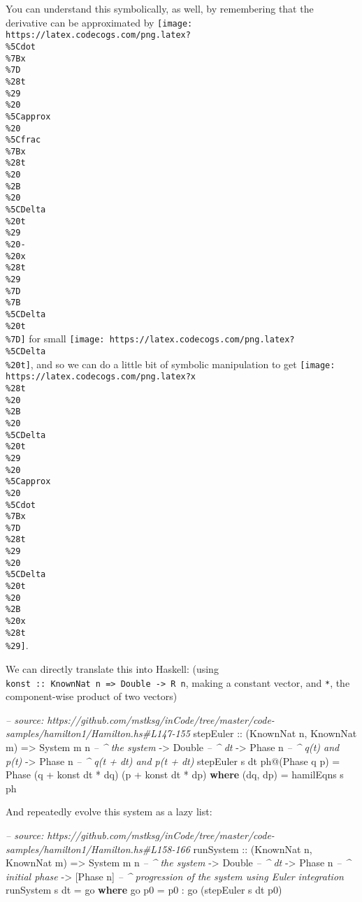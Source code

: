 \documentclass[]{article}
\newenvironment{Shaded}{}{}
\newcommand{\KeywordTok}[1]{\textcolor[rgb]{0.00,0.44,0.13}{\textbf{#1}}}
\newcommand{\DataTypeTok}[1]{\textcolor[rgb]{0.56,0.13,0.00}{#1}}
\newcommand{\CommentTok}[1]{\textcolor[rgb]{0.38,0.63,0.69}{\textit{#1}}}
\newcommand{\OtherTok}[1]{\textcolor[rgb]{0.00,0.44,0.13}{#1}}
\newcommand{\FunctionTok}[1]{\textcolor[rgb]{0.02,0.16,0.49}{#1}}
\newcommand{\NormalTok}[1]{#1}
\begin{document}
You can understand this symbolically, as well, by remembering that the
derivative can be approximated by
\texttt{[image: https://latex.codecogs.com/png.latex?\\\%5Cdot\\\%7Bx\\\%7D\\\%28t\\\%29\\\%20\\\%5Capprox\\\%20\\\%5Cfrac\\\%7Bx\\\%28t\\\%20\\\%2B\\\%20\\\%5CDelta\\\%20t\\\%29\\\%20-\\\%20x\\\%28t\\\%29\\\%7D\\\%7B\\\%5CDelta\\\%20t\\\%7D]}
for small \texttt{[image: https://latex.codecogs.com/png.latex?\\\%5CDelta\\\%20t]},
and so we can do a little bit of symbolic manipulation to get
\texttt{[image: https://latex.codecogs.com/png.latex?x\\\%28t\\\%20\\\%2B\\\%20\\\%5CDelta\\\%20t\\\%29\\\%20\\\%5Capprox\\\%20\\\%5Cdot\\\%7Bx\\\%7D\\\%28t\\\%29\\\%20\\\%5CDelta\\\%20t\\\%20\\\%2B\\\%20x\\\%28t\\\%29]}.

We can directly translate this into Haskell: (using
\texttt{konst\ ::\ KnownNat\ n\ =\textgreater{}\ Double\ -\textgreater{}\ R\ n},
making a constant vector, and \texttt{*}, the component-wise product of two
vectors)

\begin{Shaded}
\begin{Highlighting}[]
\CommentTok{-- source: https://github.com/mstksg/inCode/tree/master/code-samples/hamilton1/Hamilton.hs#L147-155}
\NormalTok{stepEuler}
\OtherTok{    ::}\NormalTok{ (}\DataTypeTok{KnownNat}\NormalTok{ n, }\DataTypeTok{KnownNat}\NormalTok{ m)}
    \OtherTok{=>} \DataTypeTok{System}\NormalTok{ m n       }\CommentTok{-- ^ the system}
    \OtherTok{->} \DataTypeTok{Double}           \CommentTok{-- ^ dt}
    \OtherTok{->} \DataTypeTok{Phase}\NormalTok{ n          }\CommentTok{-- ^ q(t) and p(t)}
    \OtherTok{->} \DataTypeTok{Phase}\NormalTok{ n          }\CommentTok{-- ^ q(t + dt) and p(t + dt)}
\NormalTok{stepEuler s dt ph}\FunctionTok{@}\NormalTok{(}\DataTypeTok{Phase}\NormalTok{ q p) }\FunctionTok{=} \DataTypeTok{Phase}\NormalTok{ (q }\FunctionTok{+}\NormalTok{ konst dt }\FunctionTok{*}\NormalTok{ dq) (p }\FunctionTok{+}\NormalTok{ konst dt }\FunctionTok{*}\NormalTok{ dp)}
  \KeywordTok{where}
\NormalTok{    (dq, dp) }\FunctionTok{=}\NormalTok{ hamilEqns s ph}
\end{Highlighting}
\end{Shaded}

And repeatedly evolve this system as a lazy list:

\begin{Shaded}
\begin{Highlighting}[]
\CommentTok{-- source: https://github.com/mstksg/inCode/tree/master/code-samples/hamilton1/Hamilton.hs#L158-166}
\NormalTok{runSystem}
\OtherTok{    ::}\NormalTok{ (}\DataTypeTok{KnownNat}\NormalTok{ n, }\DataTypeTok{KnownNat}\NormalTok{ m)}
    \OtherTok{=>} \DataTypeTok{System}\NormalTok{ m n       }\CommentTok{-- ^ the system}
    \OtherTok{->} \DataTypeTok{Double}           \CommentTok{-- ^ dt}
    \OtherTok{->} \DataTypeTok{Phase}\NormalTok{ n          }\CommentTok{-- ^ initial phase}
    \OtherTok{->}\NormalTok{ [}\DataTypeTok{Phase}\NormalTok{ n]        }\CommentTok{-- ^ progression of the system using Euler integration}
\NormalTok{runSystem s dt }\FunctionTok{=}\NormalTok{ go}
  \KeywordTok{where}
\NormalTok{    go p0 }\FunctionTok{=}\NormalTok{ p0 }\FunctionTok{:}\NormalTok{ go (stepEuler s dt p0)}
\end{Highlighting}
\end{Shaded}
\end{document}
